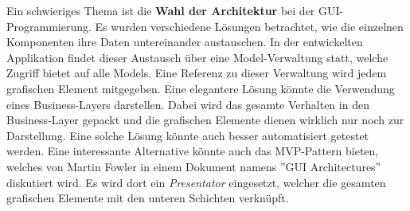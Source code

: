 \documentclass[10pt, a4paper]{scrartcl}
\begin{document}
Ein schwieriges Thema ist die \textbf{Wahl der Architektur} bei der GUI-Programmierung. Es wurden verschiedene Lösungen betrachtet, wie die einzelnen Komponenten ihre Daten untereinander austauschen. In der entwickelten Applikation findet dieser Austausch über eine Model-Verwaltung statt, welche Zugriff bietet auf alle Models. Eine Referenz zu dieser Verwaltung wird jedem grafischen Element mitgegeben. Eine elegantere Lösung könnte die Verwendung eines Business-Layers darstellen. Dabei wird das gesamte Verhalten in den Business-Layer gepackt und die grafischen Elemente dienen wirklich nur noch zur Darstellung. Eine solche Lösung könnte auch besser automatisiert getestet werden. Eine interessante Alternative könnte auch das MVP-Pattern bieten, welches von Martin Fowler in einem Dokument namens ''GUI Architectures'' diskutiert wird. Es wird dort ein \textit{Presentator} eingesetzt, welcher die gesamten grafischen Elemente mit den unteren Schichten verknüpft.




\end{document}

